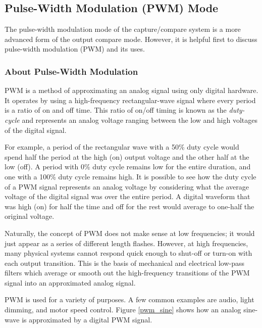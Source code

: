 \documentclass[11pt,fleqn]{book} %
\begin{document}
    
    \subsection{Pulse-Width Modulation (PWM) Mode}
    The pulse-width modulation mode of the capture/compare system is a more advanced form of the output compare mode. However, it is helpful first to discuss pulse-width modulation (PWM) and its uses. 
    
    \subsubsection{About Pulse-Width Modulation}
    PWM is a method of approximating an analog signal using only digital hardware. It operates by using a high-frequency rectangular-wave signal where every period is a ratio of on and off time. This ratio of on/off timing is known as the \textit{duty-cycle} and represents an analog voltage ranging between the low and high voltages of the digital signal. 
    
    For example, a period of the rectangular wave with a 50\% duty cycle would spend half the period at the high (on) output voltage and the other half at the low (off). A period with 0\% duty cycle remains low for the entire duration, and one with a 100\% duty cycle remains high. It is possible to see how the duty cycle of a PWM signal represents an analog voltage by considering what the average voltage of the digital signal was over the entire period. A digital waveform that was high (on) for half the time and off for the rest would average to one-half the original voltage.  
    
    Naturally, the concept of PWM does not make sense at low frequencies; it would just appear as a series of different length flashes. However, at high frequencies, many physical systems cannot respond quick enough to shut-off or turn-on with each output transition. This is the basis of mechanical and electrical low-pass filters which average or smooth out the high-frequency transitions of the PWM signal into an approximated analog signal.
    
    PWM is used for a variety of purposes. A few common examples are audio, light dimming, and motor speed control. Figure \ref{pwm_sine} shows how an analog sine-wave is approximated by a digital PWM signal. 
    
\end{document}
